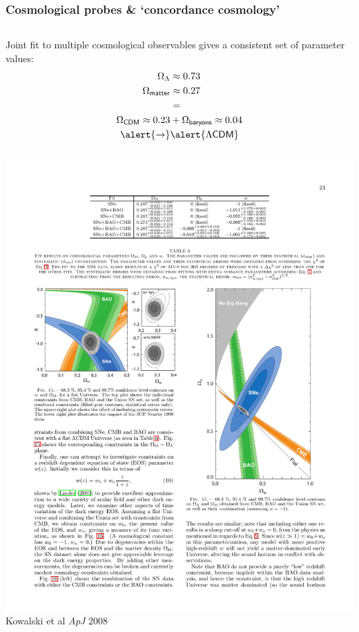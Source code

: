 \documentclass[xcolor=dvipsnames]{beamer}
\begin{document}
\begin{frame}
  \frametitle{Cosmological probes \& `concordance cosmology'}

\begin{columns}[c]
Joint fit to multiple cosmological observables gives a consistent set of parameter values:
\begin{align}
\Omega_\Lambda &\approx 0.73\nonumber\\
\Omega_\mathsf{matter} &\approx 0.27\nonumber\\
&=\nonumber\\
\Omega_\mathsf{CDM}\approx 0.23 &+ \Omega_\mathsf{baryons}\approx 0.04\nonumber\\
\alert{\rightarrow}&\alert{\Lambda\mathsf{CDM}}\nonumber
\end{align}\\
\includegraphics[width=0.52\linewidth, trim=5 0 0 0, clip=true]{lcdm1}\\
\hspace{5mm}\tiny{\color[rgb]{0, 0, 0}Kowalski et al \emph{ApJ} 2008}\\
\end{columns}


\end{frame}
\end{document}
